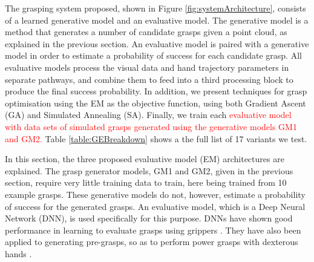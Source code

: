 \noindent
The grasping system proposed, shown in Figure \ref{fig:systemArchitecture}, consists of a learned generative model and an evaluative model. The generative model is a method that generates a number of candidate grasps given a point cloud, as explained in the previous section. An evaluative model is paired with a generative model in order to estimate a probability of success for each candidate grasp. All evaluative models process the visual data and hand trajectory parameters in separate pathways, and combine them to feed into a third processing block to produce the final success probability. In addition, we present techniques for grasp optimisation using the EM as the objective function, using both Gradient Ascent (GA) and Simulated Annealing (SA). Finally, we train each \textcolor{red}{evaluative model with data sets of simulated grasps generated using the generative models GM1 and GM2.} Table \ref{table:GEBreakdown} shows a the full list of 17 variants we test.

In this section, the three proposed evaluative model (EM) architectures are explained. The grasp generator models, GM1 and GM2, given in the previous section, require very little training data to train, here being trained from 10 example grasps. %
These generative models do not, however, estimate a probability of success for the generated grasps. An evaluative model, which is a Deep Neural Network (DNN), is used specifically for this purpose. DNNs have shown good performance in learning to evaluate grasps using grippers \cite{levine16,lenz2015deep}. They have also been applied to generating pre-grasps, so as to perform power grasps with dexterous hands \cite{varley2015generating,lu2017planning}.


